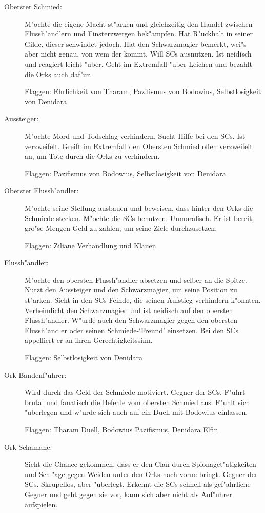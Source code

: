 \begin{description}
  \item[Oberster Schmied:] M"ochte die eigene Macht st"arken und gleichzeitig den Handel zwischen Flussh"andlern und Finsterzwergen bek"ampfen. Hat R"uckhalt in seiner Gilde, dieser schwindet jedoch. Hat den Schwarzmagier bemerkt, wei"s aber nicht genau, von wem der kommt. Will SCs ausnutzen. Ist neidisch und reagiert leicht "uber. Geht im Extremfall "uber Leichen und bezahlt die Orks auch daf"ur.

  Flaggen: Ehrlichkeit von Tharam, Pazifismus von Bodowius, Selbstlosigkeit von Denidara

  \item[Aussteiger:] M"ochte Mord und Todschlag verhindern. Sucht Hilfe bei den SCs. Ist verzweifelt. Greift im Extremfall den Obersten Schmied offen verzweifelt an, um Tote durch die Orks zu verhindern.

  Flaggen: Pazifismus von Bodowius, Selbstlosigkeit von Denidara

  \item[Oberster Flussh"andler:] M"ochte seine Stellung ausbauen und beweisen, dass hinter den Orks die Schmiede stecken. M"ochte die SCs benutzen. Unmoralisch. Er ist bereit, gro"se Mengen Geld zu zahlen, um seine Ziele durchzusetzen.

  Flaggen: Ziliane Verhandlung und Klauen

  \item[Flussh"andler:] M"ochte den obersten Flussh"andler absetzen und selber an die Spitze. Nutzt den Aussteiger und den Schwarzmagier, um seine Position zu st"arken. Sieht in den SCs Feinde, die seinen Aufstieg verhindern k"onnten. Verheimlicht den Schwarzmagier und ist neidisch auf den obersten Flussh"andler. W"urde auch den Schwarzmagier gegen den obersten Flussh"andler oder seinen Schmiede-`Freund' einsetzen. Bei den SCs appelliert er an ihren Gerechtigkeitssinn.

  Flaggen: Selbstlosigkeit von Denidara

  \item[Ork-Bandenf"uhrer:] Wird durch das Geld der Schmiede motiviert. Gegner der SCs. F"uhrt brutal und fanatisch die Befehle vom obersten Schmied aus. F"uhlt sich "uberlegen und w"urde sich auch auf ein Duell mit Bodowius einlassen.

  Flaggen: Tharam Duell, Bodowius Pazifismus, Denidara Elfin

  \item[Ork-Schamane:] Sieht die Chance gekommen, dass er den Clan durch Spionaget"atigkeiten und Schl"age gegen Weiden unter den Orks nach vorne bringt. Gegner der SCs. Skrupellos, aber "uberlegt. Erkennt die SCs schnell als gef"ahrliche Gegner und geht gegen sie vor, kann sich aber nicht als Anf"uhrer aufspielen.


\end{description}
